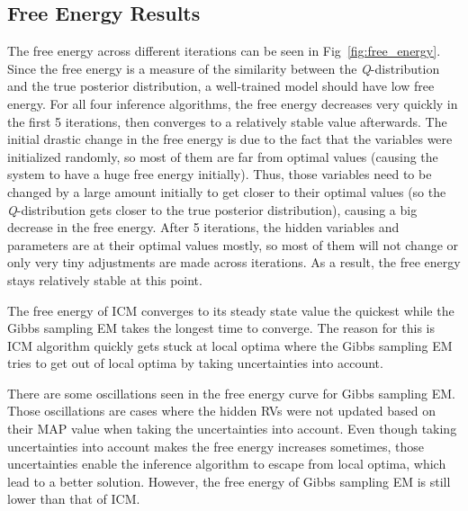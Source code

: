 \documentclass{article} %
\begin{document}
\subsection{Free Energy Results}
\label{free_energy_result}
The free energy across different iterations can be seen in Fig~\ref{fig:free_energy}. Since the free energy is a measure of the similarity between the \textit{Q}-distribution and the true posterior distribution, a well-trained model should have low free energy. For all four inference algorithms, the free energy decreases very quickly in the first 5 iterations, then converges to a relatively stable value afterwards. The initial drastic change in the free energy is due to the fact that the variables were initialized randomly, so most of them are far from optimal values (causing the system to have a huge free energy initially). Thus, those variables need to be changed by a large amount initially to get closer to their optimal values (so the \textit{Q}-distribution gets closer to the true posterior distribution), causing a big decrease in the free energy. After 5 iterations, the hidden variables and parameters are at their optimal values mostly, so most of them will not change or only very tiny adjustments are made across iterations. As a result, the free energy stays relatively stable at this point. 

The free energy of ICM converges to its steady state value the quickest while the Gibbs sampling EM takes the longest time to converge. The reason for this is ICM algorithm quickly gets stuck at local optima where the Gibbs sampling EM tries to get out of local optima by taking uncertainties into account.

There are some oscillations seen in the free energy curve for Gibbs sampling EM. Those oscillations are cases where the hidden RVs were not updated based on their MAP value when taking the uncertainties into account. Even though taking uncertainties into account makes the free energy increases sometimes, those uncertainties enable the inference algorithm to escape from local optima, which lead to a better solution. However, the free energy of Gibbs sampling EM is still lower than that of ICM. 
\end{document}
